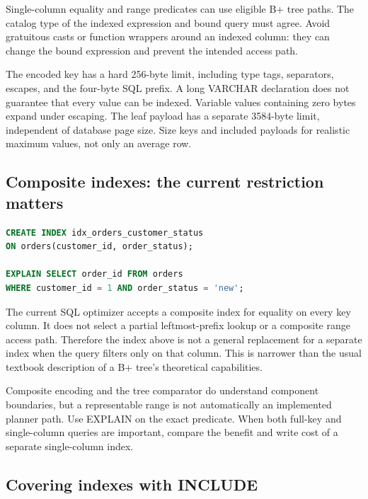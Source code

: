 Single-column equality and range predicates can use eligible B+ tree paths. The catalog type of the indexed expression and bound query must agree. Avoid gratuitous casts or function wrappers around an indexed column: they can change the bound expression and prevent the intended access path.

The encoded key has a hard 256-byte limit, including type tags, separators, escapes, and the four-byte SQL prefix. A long VARCHAR declaration does not guarantee that every value can be indexed. Variable values containing zero bytes expand under escaping. The leaf payload has a separate 3584-byte limit, independent of database page size. Size keys and included payloads for realistic maximum values, not only an average row.

\subsection{Composite indexes: the current restriction matters}

\begin{lstlisting}[language=SQL]
CREATE INDEX idx_orders_customer_status
ON orders(customer_id, order_status);

EXPLAIN SELECT order_id FROM orders
WHERE customer_id = 1 AND order_status = 'new';
\end{lstlisting}

The current SQL optimizer accepts a composite index for equality on every key column. It does not select a partial leftmost-prefix lookup or a composite range access path. Therefore the index above is not a general replacement for a separate  index when the query filters only on that column. This is narrower than the usual textbook description of a B+ tree's theoretical capabilities.

Composite encoding and the tree comparator do understand component boundaries, but a representable range is not automatically an implemented planner path. Use EXPLAIN on the exact predicate. When both full-key and single-column queries are important, compare the benefit and write cost of a separate single-column index.


\subsection{Covering indexes with INCLUDE}

